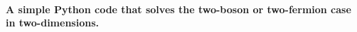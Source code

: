 \documentclass[%
oneside,                 %
final,                   %
10pt]{article}
\begin{document}
\paragraph{A simple Python code that solves the two-boson or two-fermion case in two-dimensions.}
\end{document}
